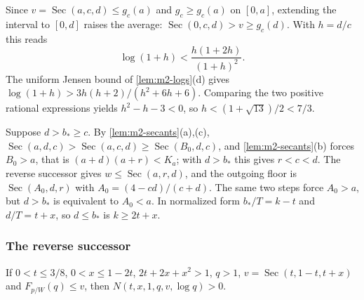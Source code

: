  Since $v=\operatorname{Sec}(a,c,d)\le g_c(a)$ and $g_c\ge g_c(a)$ on
$[0,a]$, extending the interval to $[0,d]$ raises the average:
$\operatorname{Sec}(0,c,d)>v\ge g_c(d)$. With $h=d/c$ this reads
\[
 \log(1+h)<\frac{h(1+2h)}{(1+h)^2}.
\]
The uniform Jensen bound of \cref{lem:m2-logs}(d) gives
$\log(1+h)>3h(h+2)/(h^2+6h+6)$. Comparing the two positive rational expressions yields
$h^2-h-3<0$, so $h<(1+\sqrt{13})/2<7/3$.

 Suppose $d>b_*\ge c$. By \cref{lem:m2-secants}(a),(c),
$\operatorname{Sec}(a,d,c)>\operatorname{Sec}(a,c,d)\ge\operatorname{Sec}(B_0,d,c)$, and
\cref{lem:m2-secants}(b) forces $B_0>a$, that is $(a+d)(a+r)<K_a$; with $d>b_*$ this gives $r<c<d$.
The reverse successor gives $w\le\operatorname{Sec}(a,r,d)$, and the outgoing floor is
$\operatorname{Sec}(A_0,d,r)$ with $A_0=(4-cd)/(c+d)$. The same two steps force $A_0>a$, but
$d>b_*$ is equivalent to $A_0<a$. In normalized form $b_*/T=k-t$ and $d/T=t+x$, so $d\le b_*$ is
$k\ge2t+x$.

\subsubsection{The reverse successor}\label{app:m2-reverse-signs}

\begin{lemma}\label{lem:m2-unit-shape}
If $0<t\le3/8$, $0<x\le1-2t$, $2t+2x+x^2>1$, $q>1$, $v=\operatorname{Sec}(t,1-t,t+x)$ and
$F_{p/W}(q)\le v$, then $N(t,x,1,q,v,\log q)>0$.
\end{lemma}

